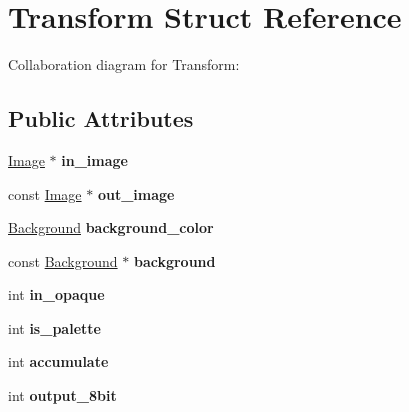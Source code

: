\hypertarget{struct_transform}{\section{Transform Struct Reference}
\label{struct_transform}
}


Collaboration diagram for Transform\+:
\subsection*{Public Attributes}
\begin{DoxyCompactItemize}
\item 
\hypertarget{struct_transform_a84f2ea77b692dc75677a371436a066d1}{\hyperlink{class_image}{Image} $\ast$ {\bfseries in\+\_\+image}}\label{struct_transform_a84f2ea77b692dc75677a371436a066d1}

\item 
\hypertarget{struct_transform_a03a35f7ac357edf9d190f74a06314f8a}{const \hyperlink{class_image}{Image} $\ast$ {\bfseries out\+\_\+image}}\label{struct_transform_a03a35f7ac357edf9d190f74a06314f8a}

\item 
\hypertarget{struct_transform_a0db086582b135a8f9fbfbfc140da9a12}{\hyperlink{struct_background}{Background} {\bfseries background\+\_\+color}}\label{struct_transform_a0db086582b135a8f9fbfbfc140da9a12}

\item 
\hypertarget{struct_transform_a3dc08e7dfec72ba42244fedd9081e348}{const \hyperlink{struct_background}{Background} $\ast$ {\bfseries background}}\label{struct_transform_a3dc08e7dfec72ba42244fedd9081e348}

\item 
\hypertarget{struct_transform_a4a3a5acc3bd8deb99d022abc84f0b360}{int {\bfseries in\+\_\+opaque}}\label{struct_transform_a4a3a5acc3bd8deb99d022abc84f0b360}

\item 
\hypertarget{struct_transform_a776e58a32cc32ea5193f487c2a49eb28}{int {\bfseries is\+\_\+palette}}\label{struct_transform_a776e58a32cc32ea5193f487c2a49eb28}

\item 
\hypertarget{struct_transform_aab27c67a81620fc3a7db859ade1e2963}{int {\bfseries accumulate}}\label{struct_transform_aab27c67a81620fc3a7db859ade1e2963}

\item 
\hypertarget{struct_transform_a10fc7fd4dddcfda735ba92bf3c922ae7}{int {\bfseries output\+\_\+8bit}}\label{struct_transform_a10fc7fd4dddcfda735ba92bf3c922ae7}


\end{DoxyCompactItemize}
